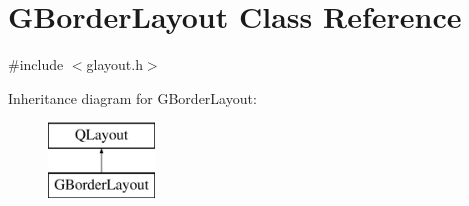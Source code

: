 \hypertarget{classGBorderLayout}{}\section{G\+Border\+Layout Class Reference}
\label{classGBorderLayout}


{\ttfamily \#include $<$glayout.\+h$>$}

Inheritance diagram for G\+Border\+Layout\+:\begin{figure}[H]
\begin{center}
\leavevmode
\includegraphics[height=2.000000cm]{classGBorderLayout}
\end{center}
\end{figure}
